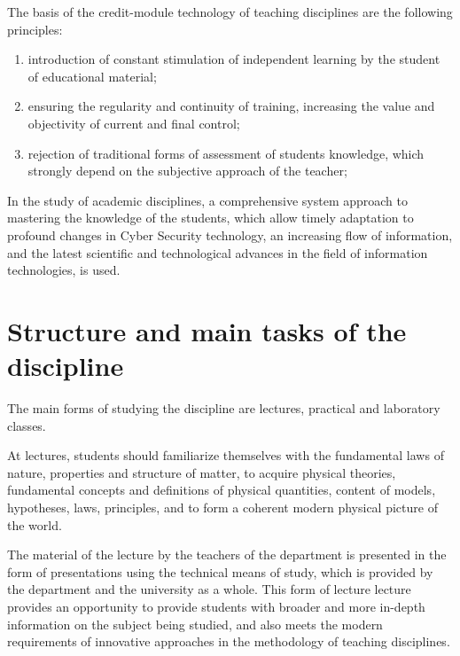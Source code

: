 \documentclass{rnp}
\begin{document}
The basis of the credit-module technology of teaching disciplines \discipline{} are the following principles:
\begin{enumerate}
\item introduction of constant stimulation of independent learning by the student of educational material;
\item ensuring the regularity and continuity of training, increasing the value and objectivity of current and final control;
\item rejection of traditional forms of assessment of students knowledge, which strongly depend on the subjective approach of the teacher;
\end{enumerate}


In the study of academic disciplines, a comprehensive system approach to mastering the knowledge of the students, which allow timely adaptation to profound changes in Cyber Security technology, an increasing flow of information, and the latest scientific and technological advances in the field of information  technologies, is used.

%
\section{Structure and main tasks of the discipline}
%

The main forms of studying the discipline \discipline{} are lectures, practical and laboratory classes.

At lectures, students should familiarize themselves with the fundamental laws of nature, properties and structure of matter, to acquire physical theories, fundamental concepts and definitions of physical quantities, content of models, hypotheses, laws, principles, and to form a coherent modern physical picture of the world.

The material of the lecture by the teachers of the department is presented in the form of presentations using the technical means of study, which is provided by the department and the university as a whole. This form of lecture lecture provides an opportunity to provide students with broader and more in-depth information on the subject being studied, and also meets the modern requirements of innovative approaches in the methodology of teaching disciplines.
\end{document}
